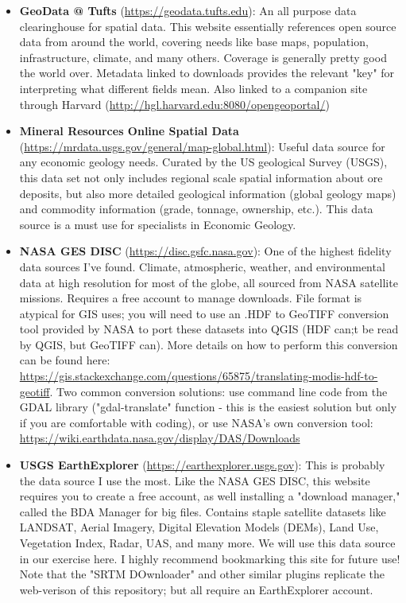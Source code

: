 \documentclass{article}
\begin{document}
\begin{itemize}
    \item \textbf{GeoData @ Tufts} (\url{https://geodata.tufts.edu}): An all purpose data clearinghouse for spatial data. This website essentially references open source data from around the world, covering needs like base maps, population, infrastructure, climate, and many others. Coverage is generally pretty good the world over. Metadata linked to downloads provides the relevant "key" for interpreting what different fields mean. Also linked to a companion site through Harvard (\url{http://hgl.harvard.edu:8080/opengeoportal/})
    \item \textbf{Mineral Resources Online Spatial Data} (\url{https://mrdata.usgs.gov/general/map-global.html}): Useful data source for any economic geology needs. Curated by the US geological Survey (USGS), this data set not only includes regional scale spatial information about ore deposits, but also more detailed geological information (global geology maps) and commodity information (grade, tonnage, ownership, etc.). This data source is a must use for specialists in Economic Geology.
    \item \textbf{NASA GES DISC} (\url{https://disc.gsfc.nasa.gov}): One of the highest fidelity data sources I've found. Climate, atmospheric, weather, and environmental data at high resolution for most of the globe, all sourced from NASA satellite missions. Requires a free account to manage downloads. File format is atypical for GIS uses; you will need to use an .HDF to GeoTIFF conversion tool provided by NASA to port these datasets into QGIS (HDF can;t be read by QGIS, but GeoTIFF can). More details on how to perform this conversion can be found here: \url{https://gis.stackexchange.com/questions/65875/translating-modis-hdf-to-geotiff}. Two common conversion solutions: use command line code from the GDAL library ("gdal-translate" function - this is the easiest solution but only if you are comfortable with coding), or use NASA's own conversion tool: \url{https://wiki.earthdata.nasa.gov/display/DAS/Downloads}
    \item \textbf{USGS EarthExplorer} (\url{https://earthexplorer.usgs.gov}): This is probably the data source I use the most. Like the NASA GES DISC, this website requires you to create a free account, as well installing a "download manager," called the BDA Manager for big files. Contains staple satellite datasets like LANDSAT, Aerial Imagery, Digital Elevation Models (DEMs), Land Use, Vegetation Index, Radar, UAS, and many more. We will use this data source in our exercise here. I highly recommend bookmarking this site for future use! Note that the "SRTM DOwnloader" and other similar plugins replicate the web-verison of this repository; but all require an EarthExplorer account.

\end{itemize}
\end{document}
